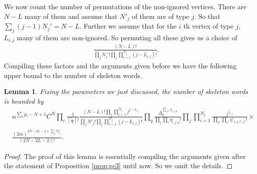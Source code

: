 \documentclass[12pt]{article}
\numberwithin{equation}{section}
\newtheorem{lemma}{Lemma}[section]
\numberwithin{equation}{section}
\theoremstyle{definition}
\renewcommand{\1}{\bf 1}
\begin{document}

We now count the number of permutations of the non-ignored vertices. There are $N-L$ many of them and assume that $N'_{j}$ of them are of type $j$. So that $\sum_{j}(j-1)N_{j}'= N-L$. Further we assume that for the $i$ th vertex of type $j$, $L_{i,j}$ many of them are non-ignored. So permuting all these gives us a choice of 
\begin{equation}\label{eq:boundprelim}
\begin{split}
\frac{(N-L)!}{\prod_{j}N_{j}'! \prod_{j}\prod_{i=1}^{N_{j}}(j-L_{i,j})!}.
\end{split}
\end{equation}
Compiling these factors and the arguments given before we have the following upper bound to the number of skeleton words.

\begin{lemma}
Fixing the parameters we just discussed, the number of skeleton words is bounded by 
\begin{equation}\label{eq:modskebound}
\begin{split}
& n^{\sum_{i}p_{i}- N +1}C^{N}\prod_{e} \frac{1}{\left[\frac{r_{e}}{2}\right]!} \frac{(N-L)!\prod_{j}\prod_{i=1}^{N_{j}}j^{j-\delta_{i,j}}}{\prod_{j}N'_{j}! \prod_{j}\prod_{i=1}^{N_{j}}(j-L_{i,j})!}\prod_{q} \frac{\Delta_{q}^{\sum_{j,i}\eta_{i,j,q} }}{\prod_{j}\prod_{i}\eta_{i,j,q}!}\prod_{j}\prod_{i=1}^{N_{j}} \frac{j^{\zeta_{i,j}}}{\prod_{j'}\prod_{i'} \eta'_{i,j,i',j'}!}\times \\
&\frac{(2m)^{2N-2L-2+ \sum_{j}N_{j}'}}{(2N-2L-2)!}.
\end{split}
\end{equation} 
\end{lemma} 
\begin{proof}
The proof of this lemma is essentially compiling the arguments given after the statement of Proposition \ref{prop:ge3} until now. So we omit the details.
\end{proof} 
\end{document}
